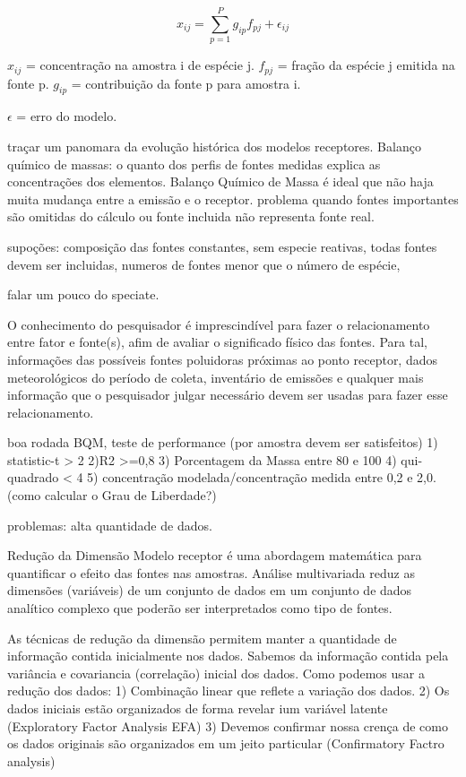\begin{equation}
  x_{ij} = \sum_{p=1}^{P} g_{ip}f_{pj} + \epsilon_{ij}
\end{equation} 

$x_{ij}$ = concentração na amostra i de espécie j.
$f_{pj}$ = fração da espécie j emitida na fonte p. 
$g_{ip}$ = contribuição da fonte p para amostra i. 

$\epsilon$ = erro do modelo.

traçar um panomara da evolução histórica dos modelos receptores.
Balanço químico de massas: o quanto dos perfis de fontes medidas explica as concentrações dos elementos.
Balanço Químico de Massa
é ideal que não haja muita mudança entre a emissão e o receptor. problema quando fontes importantes são omitidas do cálculo ou fonte incluida não representa fonte real.

supoções: composição das fontes constantes, sem especie reativas, todas fontes devem ser incluidas, numeros de fontes menor que o número de espécie, 

falar um pouco do speciate. 

O conhecimento do pesquisador é imprescindível para fazer o relacionamento entre fator e fonte(s), afim de avaliar o significado físico das fontes. Para tal, informações das possíveis fontes poluidoras próximas ao ponto receptor, dados meteorológicos do período de coleta, inventário de emissões e qualquer mais informação que o pesquisador julgar necessário devem ser usadas para fazer esse relacionamento.

boa rodada BQM, teste de performance (por amostra devem ser satisfeitos)
1) statistic-t > 2
2)R2 >=0,8
3) Porcentagem da Massa entre 80 e 100 
4) qui-quadrado < 4
5) concentração modelada/concentração medida entre 0,2 e 2,0.  (como calcular o Grau de Liberdade?)

problemas: alta quantidade de dados.

Redução da Dimensão
Modelo receptor é uma abordagem matemática para quantificar o efeito das fontes nas amostras. 
Análise multivariada reduz as dimensões (variáveis) de um conjunto de dados em um conjunto de dados analítico complexo que poderão ser interpretados como tipo de fontes.


As técnicas de redução da dimensão permitem manter a quantidade de informação contida inicialmente nos dados. Sabemos da informação contida pela variância e covariancia (correlação) inicial dos dados. Como podemos usar a redução dos dados: 
1) Combinação linear que reflete a variação dos dados. 
2) Os dados iniciais estão organizados de forma revelar ium variável latente (Exploratory Factor Analysis EFA)
3) Devemos confirmar nossa crença de como os dados originais são organizados em um jeito particular (Confirmatory Factro analysis)

